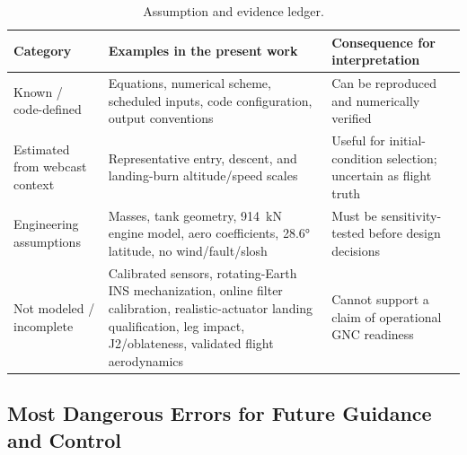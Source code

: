 \documentclass[11pt,letterpaper]{article}
\begin{document}
\begin{table}[H]
\centering
\begin{tabularx}{\textwidth}{p{}YY}
\toprule
{}\color{white}\textbf{Category} & \color{white}\textbf{Examples in the present work} & \color{white}\textbf{Consequence for interpretation}\\
\midrule
Known / code-defined & Equations, numerical scheme, scheduled inputs, code configuration, output conventions & Can be reproduced and numerically verified\\
Estimated from webcast context & Representative entry, descent, and landing-burn altitude/speed scales & Useful for initial-condition selection; uncertain as flight truth\\
Engineering assumptions & Masses, tank geometry, \SI{914}{\kilo\newton} engine model, aero coefficients, \ang{28.6} latitude, no wind/fault/slosh & Must be sensitivity-tested before design decisions\\
Not modeled / incomplete & Calibrated sensors, rotating-Earth INS mechanization, online filter calibration, realistic-actuator landing qualification, leg impact, J2/oblateness, validated flight aerodynamics & Cannot support a claim of operational GNC readiness\\
\bottomrule
\end{tabularx}
\caption{Assumption and evidence ledger.}\label{tab:assumptions}
\end{table}

\subsection{Most Dangerous Errors for Future Guidance and Control}
\end{document}
